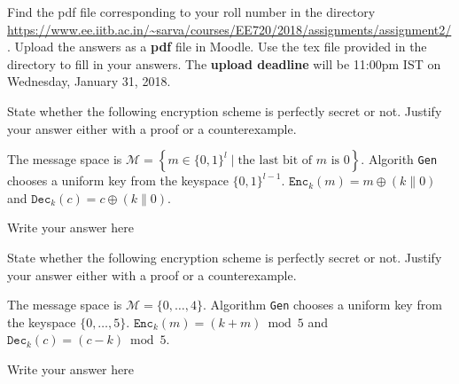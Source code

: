 \documentclass[12pt,a4paper,answers]{exam}
\begin{document}
\pagestyle{head}
\headrule
{}
%

\extraheadheight{.4in}%
\extrafootheight{-0.5in}%
\extrawidth{0.5in}%

Find the pdf file corresponding to your roll number in the directory \url{https://www.ee.iitb.ac.in/~sarva/courses/EE720/2018/assignments/assignment2/}. Upload the answers as a \textbf{pdf} file in Moodle. Use the tex file provided in the directory to fill in your answers. The \textbf{upload deadline} will be 11:00pm IST on Wednesday, January 31, 2018.
\begin{questions}
\question[5] State whether the following encryption scheme is perfectly secret or not. Justify your answer either with a proof or a counterexample.

  The message space is $\mathcal{M} = \left\{ m \in \{0,1\}^l \mid \textrm{the last bit of $m$ is 0} \right\}$. Algorith \texttt{Gen} chooses a uniform key from the keyspace $\{0,1\}^{l-1}$. $\texttt{Enc}_k(m) = m \oplus (k \| 0)$ and $\texttt{Dec}_k(c) = c \oplus (k \| 0)$.
  \begin{solution}
    Write your answer here
  \end{solution}

  \question[5] State whether the following encryption scheme is perfectly secret or not. Justify your answer either with a proof or a counterexample.

  The message space is $\mathcal{M} = \{0,\ldots,4\}$. Algorithm \texttt{Gen} chooses a uniform key from the keyspace $\{0,\ldots,5\}$. $\texttt{Enc}_k(m) = (k+m) \bmod 5$ and $\texttt{Dec}_k(c) = (c-k) \bmod 5$.
  \begin{solution}
    Write your answer here
  \end{solution}

  
\end{questions}
\end{document}

